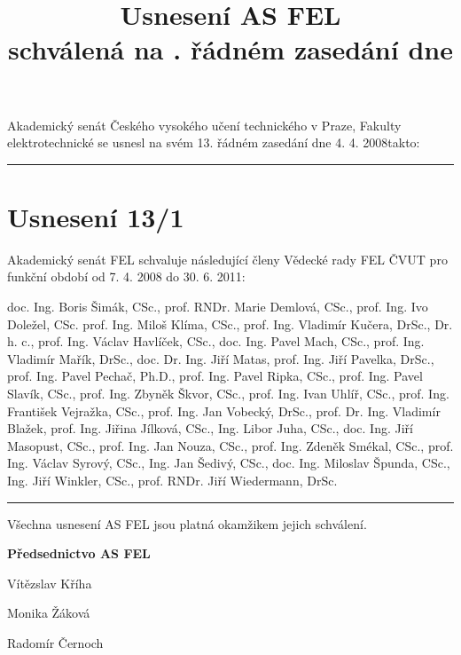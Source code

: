 \documentclass[a4paper,12pt,notitlepage]{article}
\title{Usnesení AS FEL\\schválená na \cislo. řádném zasedání dne \datum}
\author{}\date{}
\newcommand{\cislo}{13}
\newcommand{\datum}{4. 4. 2008}
\newcommand{\hr}{\bigskip\hrule\bigskip}
\newcommand{\usneseni}[5]{
\section*{#1}

#2

}
\begin{document}
\maketitle
\thispagestyle{empty}


Akademický senát Českého vysokého učení technického v Praze, Fakulty
elektrotechnické se usnesl na svém \cislo. řádném zasedání dne \datum takto:\hr


\usneseni{Usnesení \cislo/1}{Akademický senát FEL schvaluje následující členy Vědecké rady FEL ČVUT pro funkční období od 7. 4. 2008 do 30. 6. 2011:

  doc. Ing. Boris Šimák, CSc., 
  prof. RNDr. Marie Demlová, CSc.,
  prof. Ing. Ivo Doležel, CSc.
  prof. Ing. Miloš Klíma, CSc.,
  prof. Ing. Vladimír Kučera, DrSc., Dr. h. c.,
  prof. Ing. Václav Havlíček, CSc.,
  doc. Ing. Pavel Mach, CSc.,
  prof. Ing. Vladimír Mařík, DrSc.,
  doc. Dr. Ing. Jiří Matas,
  prof. Ing. Jiří Pavelka, DrSc.,
  prof. Ing. Pavel Pechač, Ph.D.,
  prof. Ing. Pavel Ripka, CSc.,
  prof. Ing. Pavel Slavík, CSc.,
  prof. Ing. Zbyněk Škvor, CSc.,
  prof. Ing. Ivan Uhlíř, CSc.,
  prof. Ing. František Vejražka, CSc.,
  prof. Ing. Jan Vobecký, DrSc.,
  prof. Dr. Ing. Vladimír Blažek,
  prof. Ing. Jiřina Jílková, CSc.,
  Ing. Libor Juha, CSc.,
  doc. Ing. Jiří Masopust, CSc.,
  prof. Ing. Jan Nouza, CSc.,
  prof. Ing. Zdeněk Smékal, CSc.,
  prof. Ing. Václav Syrový, CSc.,
  Ing. Jan Šedivý, CSc.,
  doc. Ing. Miloslav Špunda, CSc.,
  Ing. Jiří Winkler, CSc.,
  prof. RNDr. Jiří Wiedermann, DrSc.}

\bigskip\bigskip\bigskip\bigskip\bigskip\bigskip\hr
Všechna usnesení AS FEL jsou platná okamžikem jejich schválení.

\begin{center}
\textbf{Předsednictvo AS FEL}

Vítězslav Kříha

Monika Žáková

Radomír Černoch
\end{center}
\end{document}
